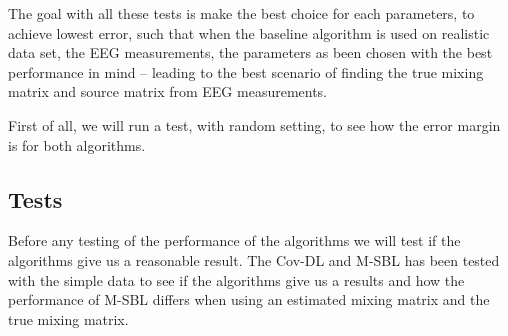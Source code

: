 The goal with all these tests is make the best choice for each parameters, to achieve lowest error, such that when the baseline algorithm is used on realistic data set, the EEG measurements, the parameters as been chosen with the best performance in mind -- leading to the best scenario of finding the true mixing matrix and source matrix from EEG measurements.

First of all, we will run a test, with random setting, to see how the error margin is for both algorithms.


\subsection{Tests}

Before any testing of the performance of the algorithms we will test if the algorithms give us a reasonable result. The Cov-DL and M-SBL has been tested with the simple data to see if the algorithms give us a results and how the performance of M-SBL differs when using an estimated mixing matrix and the true mixing matrix.

